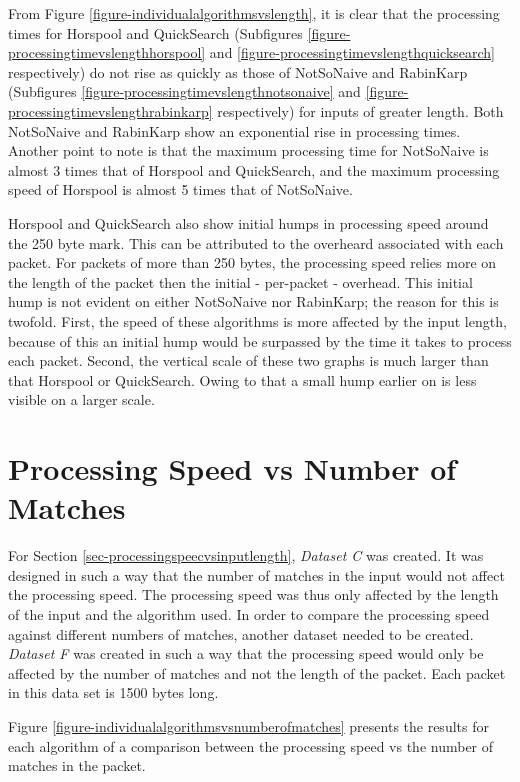 \documentclass[11pt]{article}
\begin{document}
From Figure \ref{figure-individualalgorithmsvslength}, it is clear that the processing times for Horspool and QuickSearch (Subfigures \ref{figure-processingtimevslengthhorspool} and \ref{figure-processingtimevslengthquicksearch} respectively) do not rise as quickly as those of NotSoNaive and RabinKarp (Subfigures \ref{figure-processingtimevslengthnotsonaive} and \ref{figure-processingtimevslengthrabinkarp} respectively) for inputs of greater length. Both NotSoNaive and RabinKarp show an exponential rise in processing times. Another point to note is that the maximum processing time for NotSoNaive is almost 3 times that of Horspool and QuickSearch, and the maximum processing speed of Horspool is almost 5 times that of NotSoNaive.

Horspool and QuickSearch also show initial humps in processing speed around the 250 byte mark. This can be attributed to the overheard associated with each packet. For packets of more than 250 bytes, the processing speed relies more on the length of the packet then the initial - per-packet - overhead. This initial hump is not evident on either NotSoNaive nor RabinKarp; the reason for this is twofold. First, the speed of these algorithms is more affected by the input length, because of this an initial hump would be surpassed by the time it takes to process each packet. Second, the vertical scale of these two graphs is much larger than that Horspool or QuickSearch. Owing to that a small hump earlier on is less visible on a larger scale.


\section{Processing Speed vs Number of Matches}

For Section \ref{sec-processingspeecvsinputlength}, \textit{Dataset C} was created. It was designed in such a way that the number of matches in the input would not affect the processing speed. The processing speed was thus only affected by the length of the input and the algorithm used. In order to compare the processing speed against different numbers of matches, another dataset needed to be created. \textit{Dataset F} was created in such a way that the processing speed would only be affected by the number of matches and not the length of the packet. Each packet in this data set is 1500 bytes long.

Figure \ref{figure-individualalgorithmsvsnumberofmatches} presents the results for each algorithm of a comparison between the processing speed vs the number of matches in the packet.
\end{document}

